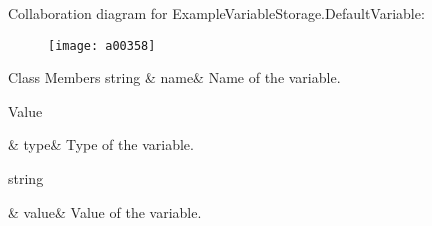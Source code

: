 Collaboration diagram for Example\-Variable\-Storage.\-Default\-Variable\-:
\nopagebreak
\begin{figure}[H]
\begin{center}
\leavevmode
\texttt{[image: a00358]}
\end{center}
\end{figure}
\begin{DoxyFields}{Class Members}
\hypertarget{a00085_a609feaa53936e7dc42248ff2ba68454a}{string}\label{a00085_a609feaa53936e7dc42248ff2ba68454a}
&
name&
Name of the variable. \\
\hline

\hypertarget{a00085_a904347efdca12f40243c7dedb646153d}{Value}\label{a00085_a904347efdca12f40243c7dedb646153d}
&
type&
Type of the variable. \\
\hline

\hypertarget{a00085_a0f00ecb21b58aa754a4bbb61edf62818}{string}\label{a00085_a0f00ecb21b58aa754a4bbb61edf62818}
&
value&
Value of the variable. \\
\hline

\end{DoxyFields}
